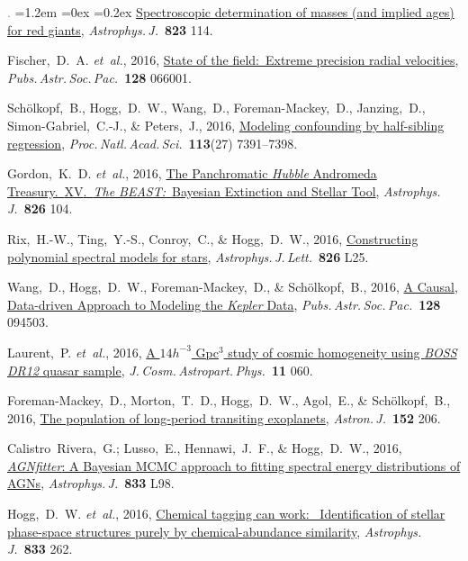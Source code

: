 \documentclass[10pt,letterpaper]{article}
\newcommand{\acronym}[1]{{\small{#1}}}
\newcommand{\foreign}[1]{\textsl{#1}}
\newcommand{\etal}{\foreign{et~al.}}
\newcommand{\project}[1]{\textsl{#1}}
\newcommand{\doi}[2]{\href{http://dx.doi.org/#1}{{#2}}}
\newcommand{\deemph}[1]{\textcolor{grey}{\footnotesize{#1}}}
\newcommand{\pubnumber}[1]{\deemph{{#1}.}}
\newcounter{refpubnum}
\newcommand{\hogglist}{%
    \rightmargin=0in
    \leftmargin=1.2em
    \topsep=0ex
    \partopsep=0pt
    \itemsep=0.2ex
    \parsep=0pt
    \itemindent=-1.0\leftmargin
    \listparindent=0.0\leftmargin
    \settowidth{\labelsep}{~}
    \usecounter{refpubnum}
  }
\begin{document}
\begin{list}{\pubnumber{\therefpubnum}}{\hogglist}
\doi{10.3847/0004-637X/823/2/114}{Spectroscopic determination of masses (and implied ages) for red giants},
\textit{Astrophys.\,J.}\ \textbf{823} 114.
\item
Fischer,~D.~A. \etal, 2016,
\doi{10.1088/1538-3873/128/964/066001}{State of the field:\ Extreme precision radial velocities},
\textit{Pubs.\,Astr.\,Soc.\,Pac.}\ \textbf{128} 066001.
\item
Sch\"olkopf,~B., Hogg,~D.~W., Wang,~D., Foreman-Mackey,~D., Janzing,~D., Simon-Gabriel,~C.-J., \& Peters,~J., 2016,
\doi{10.1073/pnas.1511656113}{Modeling confounding by half-sibling regression},
\textit{Proc.\,Natl.\,Acad.\,Sci.}\ \textbf{113}(27) 7391--7398.
\item
Gordon,~K.~D. \etal, 2016,
\doi{10.3847/0004-637X/826/2/104}{The Panchromatic \project{Hubble} Andromeda Treasury.\ \acronym{XV}.\
\project{The BEAST:}\ Bayesian Extinction and Stellar Tool},
\textit{Astrophys.\,J.}\ \textbf{826} 104.
\item
Rix,~H.-W., Ting,~Y.-S., Conroy,~C., \& Hogg,~D.~W., 2016,
\doi{10.3847/2041-8205/826/2/L25}{Constructing polynomial spectral models for stars},
\textit{Astrophys.\,J.\,Lett.}\ \textbf{826} L25.
\item
Wang,~D., Hogg,~D.~W., Foreman-Mackey,~D., \& Sch\"olkopf,~B., 2016,
\doi{10.1088/1538-3873/128/967/094503}{A Causal, Data-driven Approach to Modeling the \project{Kepler} Data},
\textit{Pubs.\,Astr.\,Soc.\,Pac.}\ \textbf{128} 094503.
\item
Laurent,~P. \etal, 2016,
\doi{10.1088/1475-7516/2016/11/060}{A $14 h^{-3}$ Gpc$^3$ study of cosmic homogeneity using \project{BOSS DR12} quasar sample},
\textit{J.\,Cosm.\,Astropart.\,Phys.}\ \textbf{11} 060.
\item
Foreman-Mackey,~D., Morton,~T.~D., Hogg,~D.~W., Agol,~E., \& Sch\"olkopf,~B., 2016,
\doi{10.3847/0004-6256/152/6/206}{The population of long-period transiting exoplanets},
\textit{Astron.\,J.}\ \textbf{152} 206.
\item
Calistro~Rivera,~G.; Lusso,~E., Hennawi,~J.~F., \& Hogg,~D.~W., 2016,
\doi{10.3847/1538-4357/833/1/98}{\project{AGNfitter}: A Bayesian MCMC approach to fitting spectral energy distributions of AGNs},
\textit{Astrophys.\,J.}\ \textbf{833} L98.
\item
Hogg,~D.~W. \etal, 2016,
\doi{10.3847/1538-4357/833/2/262}{Chemical tagging can work:\ %
Identification of stellar phase-space structures purely by chemical-abundance similarity},
\textit{Astrophys.\,J.}\ \textbf{833} 262.
\item

\end{list}
\end{document}
